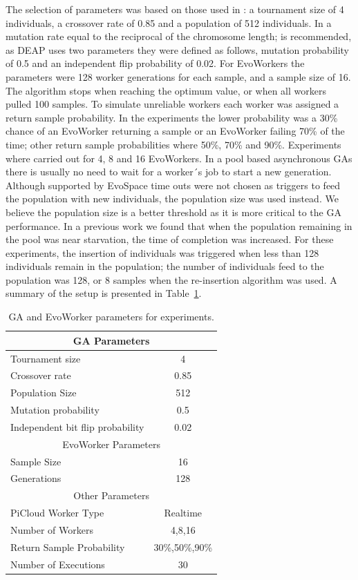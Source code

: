 \documentclass{llncs}
\begin{document}
The selection of parameters was based on those used in \cite{Alba:2002dq}: a
tournament size of 4 individuals, a crossover rate of 0.85 and a
population of 512 individuals. In  \cite{Jong:PS97} a mutation rate
equal to the reciprocal of the chromosome length; is recommended, as
DEAP uses two parameters they were defined as follows, mutation
probability of 0.5 and an independent flip probability of 0.02. For
EvoWorkers the parameters were 128 worker generations for each
sample, and a sample size of 16. The algorithm stops when reaching the optimum value, or when all workers pulled 100 samples. To simulate unreliable workers each worker was assigned a return sample probability. In the experiments the lower probability was a 30\% chance of an EvoWorker returning a sample or
an EvoWorker failing 70\% of the time; other return sample probabilities
where 50\%, 70\% and 90\%. Experiments where carried out for 4, 
8 and 16 EvoWorkers. In a pool based  asynchronous GAs there is usually no need 
to wait for a worker´s job to start a new generation. Although supported by EvoSpace
time outs were not chosen as triggers to feed the population with new
individuals, the population size was used instead. We believe the population
size is a better threshold as it is more critical to the GA performance. 
In a previous work we found that when the population remaining in the pool 
was near starvation, the time of completion was increased. For these 
experiments, the insertion of individuals was triggered when less than 128
individuals remain in the population; the number of individuals feed to the
population was 128, or 8 samples when the re-insertion algorithm
was used. A summary of the setup is presented in Table~\ref{params}.

\begin{table}[!t]
\renewcommand{\arraystretch}{1.3}
\caption{GA and EvoWorker parameters for experiments.}
\label{params}
\centering
\begin{tabular}{|l|c|}
\hline
\multicolumn{2}{|c|}{GA Parameters} \\
\hline
Tournament size & 4 \\
Crossover rate & 0.85  \\
Population Size & 512 \\
Mutation probability & 0.5 \\
Independent bit flip probability  & 0.02 \\
\hline
\multicolumn{2}{|c|}{EvoWorker Parameters} \\
\hline
Sample Size & 16 \\
Generations & 128 \\
\hline
\multicolumn{2}{|c|}{Other Parameters} \\
\hline
PiCloud Worker Type & Realtime \\
Number of Workers & 4,8,16 \\
Return Sample Probability & 30\%,50\%,90\% \\
Number of Executions & 30 \\

\hline

\end{tabular}
\end{table}
\end{document}
